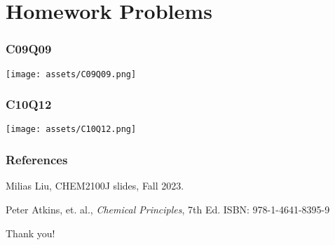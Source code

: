 \documentclass[aspectratio=169]{beamer}
\begin{document}
\section{Homework Problems}
\begin{frame}
  \frametitle{C09Q09}
  \texttt{[image: assets/C09Q09.png]}
\end{frame}
\begin{frame}
  \frametitle{C10Q12}
  \texttt{[image: assets/C10Q12.png]}
\end{frame}
\begin{frame}
  \frametitle{References}
  
  \begin{thebibliography}{99} %
  Milias Liu, CHEM2100J slides, Fall 2023.
    
  Peter Atkins, et. al., \textit{Chemical Principles}, 7th Ed. ISBN: 978-1-4641-8395-9
    
  \end{thebibliography}
\end{frame}

\begin{frame}
  \Huge{\centerline{Thank you!}}
\end{frame}
\end{document}
